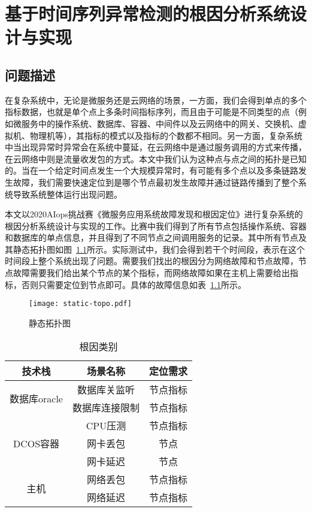 
\chapter{基于时间序列异常检测的根因分析系统设计与实现}
\label{cha:intro}
\section{问题描述}
在复杂系统中，无论是微服务还是云网络的场景，一方面，我们会得到单点的多个指标数据，也就是单个点上多条时间指标序列，而且由于可能是不同类型的点（例如微服务中的操作系统、数据库、容器、中间件以及云网络中的网关、交换机、虚拟机、物理机等），其指标的模式以及指标的个数都不相同。另一方面，复杂系统中当出现异常时异常会在系统中蔓延，在云网络中是通过服务调用的方式来传播，在云网络中则是流量收发包的方式。本文中我们认为这种点与点之间的拓扑是已知的。当在一个给定时间点发生一个大规模异常时，有可能有多个点以及多条链路发生故障，我们需要快速定位到是哪个节点最初发生故障并通过链路传播到了整个系统导致系统整体运行出现问题。

本文以2020AIops挑战赛《微服务应用系统故障发现和根因定位》进行复杂系统的根因分析系统设计与实现的工作。比赛中我们得到了所有节点包括操作系统、容器和数据库的单点信息，并且得到了不同节点之间调用服务的记录。其中所有节点及其静态拓扑图如图~\ref{fig:static_topo}所示。实际测试中，我们会得到若干个时间段，表示在这个时间段上整个系统出现了问题。需要我们找出的根因分为网络故障和节点故障，节点故障需要我们给出某个节点的某个指标，而网络故障如果在主机上需要给出指标，否则只需要定位到节点即可。具体的故障信息如表~\ref{tab:error}所示。

\begin{figure}[htbp]
    \centering
    \texttt{[image: static-topo.pdf]}
    \caption{静态拓扑图}
    \label{fig:static_topo}
  \end{figure}

\begin{table}
  \centering 
  \begin{tabular}{ccc}
    \toprule
    技术栈 & 场景名称 & 定位需求\\
    \midrule
    \multirow{2}{*}{数据库oracle} & 数据库关监听 & 节点指标\\
     & 数据库连接限制 & 节点指标 \\
    \multirow{3}{*}{DCOS容器} & CPU压测 & 节点指标\\
     & 网卡丢包 & 节点\\
     & 网卡延迟 & 节点\\
    \multirow{2}{*}{主机} & 网络丢包& 节点指标\\
    & 网络延迟 & 节点指标\\
    \bottomrule
  \end{tabular}
  \caption{根因类别}
  \label{tab:error}
\end{table}

